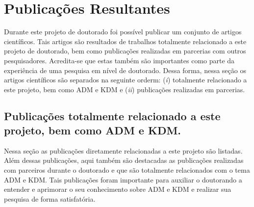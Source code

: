 \section{Publicações Resultantes}\label{sec:publicacoes_resultantes}
Durante este projeto de doutorado foi possível publicar um conjunto de artigos científicos. Tais artigos são resultados de trabalhos totalmente relacionado a este projeto de doutorado, bem como publicações realizadas em parcerias com outros pesquisadores. Acredita-se que estas também são importantes como parte da experiência de uma pesquisa em nível de doutorado. Dessa forma, nessa seção os artigos científicos são separados na seguinte orderm: (\textit{i}) totalmente relacionado a este projeto, bem como ADM e KDM e (\textit{ii}) publicações realizadas em parcerias.

\subsection{Publicações totalmente relacionado a este projeto, bem como ADM e KDM.}

Nessa seção as publicações diretamente relacionadas a este projeto são listadas. Além dessas publicações, aqui também são destacadas as publicações realizadas com parceiros durante o doutorado e que são totalmente relacionados com o tema ADM e KDM. Tais publicações foram importante para auxiliar o doutorando a entender e aprimorar o seu conhecimento sobre ADM e KDM e realizar sua pesquisa de forma satisfatória.

